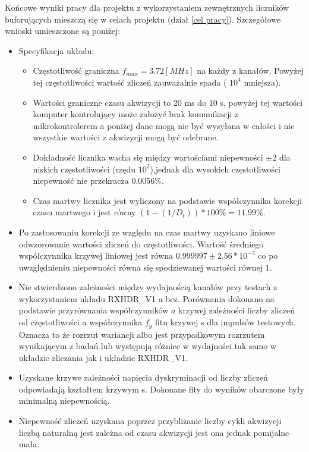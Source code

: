 Końcowe wyniki pracy dla projektu z wykorzystaniem zewnętrznych liczników buforujących mieszczą się w celach projektu (dział \ref{cel pracy}). Szczegółowe wnioski umieszczone są poniżej:
\begin{itemize}
        \item Specyfikacja układu:
        \begin{itemize}
                \item Częstotliwość graniczna $f_{max} = 3.72 [MHz]$ na każdy z kanałów. Powyżej tej częstotliwości wartość zliczeń zauważalnie spada ( $10^4$ mniejsza).
                \item Wartości graniczne czasu akwizycji to 20 ms do 10 s, powyżej tej wartości komputer kontrolujący może założyć brak komunikacji z mikrokontrolerem a poniżej dane mogą nie być wysyłana w całości i nie wszystkie wartości z akwizycji mogą być odebrane. 
                \item Dokładność licznika wacha się między wartościami niepewności $\pm 2$ dla niskich częstotliwości (rzędu $10^{2}$),jednak dla wysokich częstotliwości niepewność nie przekracza 0.0056\%.
                \item Czas martwy licznika jest wyliczony na podstawie współczynnika korekcji czasu martwego i jest równy $(1-(1/D_t))* 100\% = 11.99 \%$.
        \end{itemize}
        \item Po zastosowaniu korekcji ze względu na czas martwy uzyskano liniowe odwzorowanie wartości zliczeń do częstotliwości. Wartość średniego współczynnika krzywej liniowej jest równa $ 0.999997 \pm 2.56 * 10^{-5}$ co po uwzględnieniu niepewności równa się spodziewanej wartości równej $1$.
        \item Nie stwierdzono zależności między wydajnością kanałów przy testach z wykorzystaniem układu RXHDR\_V1 a bez. Porównania dokonano na podstawie przyrównania współczynników $a$ krzywej zależności liczby zliczeń od częstotliwości a współczynnika $f_g$ fitu krzywej s dla impulsów testowych. Oznacza to że rozrzut wariancji albo jest przypadkowym rozrzutem wynikającym z badań lub występują różnice w wydajności tak samo w układzie zliczania jak i układzie RXHDR\_V1.
        \item Uzyskane krzywe zależności napięcia dyskryminacji od liczby zliczeń odpowiadają kształtem krzywym s. Dokonane fity do wyników obarczone były minimalną niepewnością.     
        \item Niepewność zliczeń uzyskana poprzez przybliżanie liczby cykli akwizycji liczbą naturalną jest zależna od czasu akwizycji jest ona jednak pomijalne mała. 
\end{itemize}


